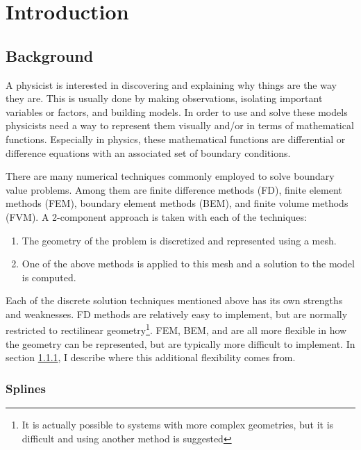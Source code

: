 \section{Introduction} \label{sec:Intro}

  \subsection{Background} \label{ssec:background}

    A physicist is interested in discovering and explaining why things are the way they are. This is usually done by making observations, isolating important variables or factors, and building models. In order to use and solve these models physicists need a way to represent them visually and/or in terms of mathematical functions. Especially in physics, these mathematical functions are differential or difference equations with an associated set of boundary conditions.

    There are many numerical techniques commonly employed to solve boundary value problems. Among them are finite difference methods (FD), finite element methods (FEM), boundary element methods (BEM), and finite volume methods (FVM). A 2-component approach is taken with each of the techniques:

    \begin{enumerate}[1)]
      \item The geometry of the problem is discretized and represented using a mesh.
      \item One of the above methods is applied to this mesh and a solution to the model is computed.
    \end{enumerate}
    \mainstretch

    Each of the discrete solution techniques mentioned above has its own strengths and weaknesses. FD methods are relatively easy to implement, but are normally restricted to rectilinear geometry\footnote{It is actually possible to systems with more complex geometries, but it is difficult and using another method is suggested}. FEM, BEM, and are all more flexible in how the geometry can be represented, but are typically more difficult to implement. In section \ref{ssub:splines}, I describe where this additional flexibility comes from.

    \subsubsection{Splines} \label{ssub:splines}

